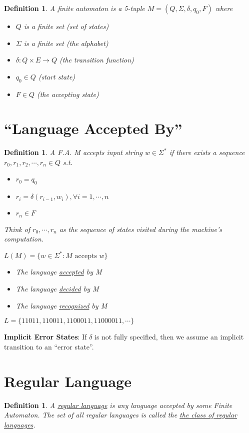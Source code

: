 \documentclass[twoside]{article}
\newtheorem{definition}[theorem]{Definition}
\begin{document}
\begin{definition}
  A finite automaton is a 5-tuple $M=(Q, \Sigma, \delta, q_0, F)$ where
  \begin{itemize}
    \item $Q$ is a finite set (set of states)
    \item $\Sigma$ is a finite set (the alphabet)
    \item $\delta: Q \times E \rightarrow Q$ (the transition function)
    \item $q_0 \in Q$ (start state)
    \item $F \in Q$ (the accepting state)
  \end{itemize}
\end{definition}

\section{``Language Accepted By''}

\begin{definition}
  A F.A. M accepts input string $w \in \Sigma^*$ if there exists a sequence $r_0, r_1, r_2, \cdots, r_n \in Q$ s.t.
  \begin{itemize}
    \item $r_0 = q_0$
    \item $r_i = \delta(r_{i-1}, w_i), \forall i = 1, \cdots, n$
    \item $r_n \in F$
  \end{itemize}
  Think of $r_0, \cdots, r_n$ as the sequence of states visited during the machine's computation.
  
  $L(M) = \{w \in \Sigma^*: M \text{ accepts } w\}$
  
  \begin{itemize}
    \item The language \underline{accepted} by M
    \item The language \underline{decided} by M 
    \item The language \underline{recognized} by M
  \end{itemize}

\end{definition}

$L = \{11011, 110011, 1100011, 11000011, \cdots\}$

\textbf{Implicit Error States}: If $\delta$ is not fully specified, then we assume an implicit transition to an ``error state''.

\section{Regular Language}

\begin{definition}
  A \underline{regular language} is any language accepted by some Finite Automaton. The set of all regular languages is called the \underline{the class of regular languages}.
\end{definition}
\end{document}
